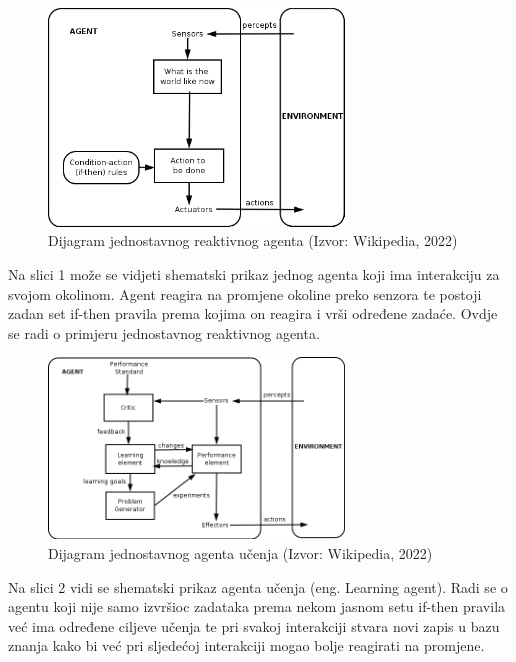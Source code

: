 \documentclass{foi}
\begin{document}
\begin{figure}[h!]
    \centering
    \includegraphics[width=0.7\textwidth]{slike/agentReakcije.png}
    \caption{Dijagram jednostavnog reaktivnog agenta (Izvor: Wikipedia, 2022)}
    \label{fig:dijagramAgenti}
\end{figure}

Na slici 1 može se vidjeti shematski prikaz jednog agenta koji ima interakciju za svojom okolinom. Agent reagira na promjene okoline preko senzora te postoji zadan set if-then pravila prema kojima on reagira i vrši određene zadaće. Ovdje se radi o primjeru jednostavnog reaktivnog agenta. 

\begin{figure}[h!]
	\centering
	\includegraphics[width=0.7\textwidth]{slike/agentUcenja.png}
	\caption{Dijagram jednostavnog agenta učenja (Izvor: Wikipedia, 2022)}
	\label{fig:dijagramAgenti}
\end{figure}

Na slici 2 vidi se shematski prikaz agenta učenja (eng. Learning agent). Radi se o agentu koji nije samo izvršioc zadataka prema nekom jasnom setu if-then pravila već ima određene ciljeve učenja te pri svakoj interakciji stvara novi zapis u bazu znanja kako bi već pri sljedećoj interakciji mogao bolje reagirati na promjene.
\end{document}
